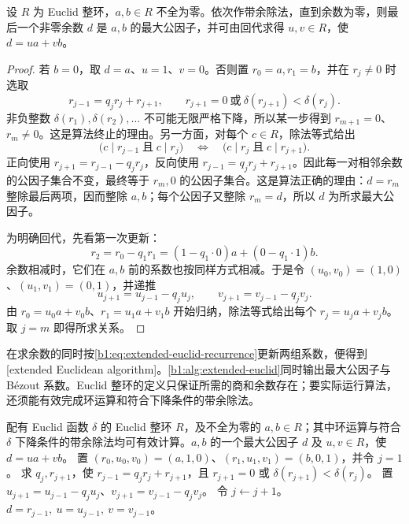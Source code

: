 \begin{proposition}[Euclid 算法]\label{b1:prop:euclidean-algorithm}
	设 \(R\) 为 Euclid 整环，\(a,b\in R\) 不全为零。依次作带余除法，直到余数为零，则最后一个非零余数 \(d\) 是 \(a,b\) 的最大公因子，并可由回代求得 \(u,v\in R\)，使 \(d=ua+vb\)。
\end{proposition}
\begin{proof}
	若 \(b=0\)，取 \(d=a\)、\(u=1\)、\(v=0\)。否则置 \(r_0=a,r_1=b\)，并在 \(r_j\ne0\) 时选取
	\[
		r_{j-1}=q_jr_j+r_{j+1}, \qquad r_{j+1}=0\ \text{或}\ \delta(r_{j+1})<\delta(r_j).
	\]
	非负整数 \(\delta(r_1),\delta(r_2),\ldots\) 不可能无限严格下降，所以某一步得到 \(r_{m+1}=0\)、\(r_m\ne0\)。这是算法终止的理由。另一方面，对每个 \(c\in R\)，除法等式给出
	\[
		\bigl(c\mid r_{j-1}\;\text{且}\;c\mid r_j\bigr) \quad\Longleftrightarrow\quad \bigl(c\mid r_j\;\text{且}\;c\mid r_{j+1}\bigr).
	\]
	正向使用 \(r_{j+1}=r_{j-1}-q_jr_j\)，反向使用 \(r_{j-1}=q_jr_j+r_{j+1}\)。因此每一对相邻余数的公因子集合不变，最终等于 \(r_m,0\) 的公因子集合。这是算法正确的理由：\(d=r_m\) 整除最后两项，因而整除 \(a,b\)；每个公因子又整除 \(r_m=d\)，所以 \(d\) 为所求最大公因子。

	为明确回代，先看第一次更新：
	\[
		r_2=r_0-q_1r_1 =(1-q_1\cdot0)a+(0-q_1\cdot1)b.
	\]
	余数相减时，它们在 \(a,b\) 前的系数也按同样方式相减。于是令 \((u_0,v_0)=(1,0)\)、\((u_1,v_1)=(0,1)\)，并递推
	\begin{equation}\label{b1:eq:extended-euclid-recurrence}
		u_{j+1}=u_{j-1}-q_ju_j,\qquad v_{j+1}=v_{j-1}-q_jv_j.
	\end{equation}
	由 \(r_0=u_0a+v_0b\)、\(r_1=u_1a+v_1b\) 开始归纳，除法等式给出每个 \(r_j=u_ja+v_jb\)。取 \(j=m\) 即得所求关系。
\end{proof}

在求余数的同时按\eqref{b1:eq:extended-euclid-recurrence}更新两组系数，便得到[extended Euclidean algorithm]。\cref{b1:alg:extended-euclid}同时输出最大公因子与 Bézout 系数。Euclid 整环的定义只保证所需的商和余数存在；要实际运行算法，还须能有效完成环运算和符合下降条件的带余除法。

\begin{algorithm}[htbp]
	\caption{扩展 Euclid 算法}
	\label{b1:alg:extended-euclid}
	\begin{algorithmsteps}{配有 Euclid 函数 \(\delta\) 的 Euclid 整环 \(R\)，及不全为零的 \(a,b\in R\)；其中环运算与符合 \(\delta\) 下降条件的带余除法均可有效计算。}{\(a,b\) 的一个最大公因子 \(d\) 及 \(u,v\in R\)，使 \(d=ua+vb\)。}
		\State 置 \((r_0,u_0,v_0)=(a,1,0)\)、\((r_1,u_1,v_1)=(b,0,1)\)，并令 \(j=1\)。
			\State 求 \(q_j,r_{j+1}\)，使 \(r_{j-1}=q_jr_j+r_{j+1}\)，且 \(r_{j+1}=0\) 或 \(\delta(r_{j+1})<\delta(r_j)\)。
			\State 置 \(u_{j+1}=u_{j-1}-q_ju_j\)、\(v_{j+1}=v_{j-1}-q_jv_j\)。
			\State 令 \(j\leftarrow j+1\)。
		\EndWhile
		\State \Return \(d=r_{j-1},\ u=u_{j-1},\ v=v_{j-1}\)。
	\end{algorithmsteps}
\end{algorithm}

